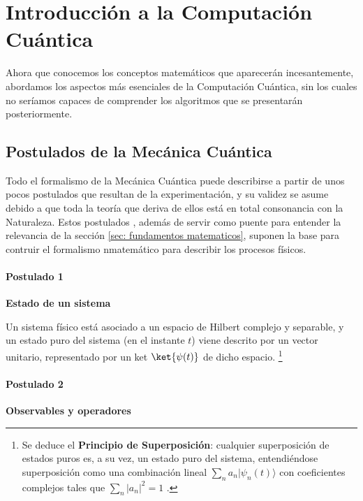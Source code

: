 \documentclass[11pt,a4paper,twoside,pdf]{article}
\numberwithin{equation}{section}
\begin{document}
		

			

	

\newpage
	
\section{Introducción a la Computación Cuántica} \label{sec: intro CC}
	  
Ahora que conocemos los conceptos matemáticos que aparecerán incesantemente, abordamos los aspectos más esenciales de la Computación Cuántica, sin los cuales no seríamos capaces de comprender los algoritmos que se presentarán posteriormente.

	\subsection{Postulados de la Mecánica Cuántica }
	
	Todo el formalismo de la Mecánica Cuántica puede describirse a partir de unos pocos postulados que resultan de la experimentación, y su validez se asume debido a que toda la teoría que deriva de ellos está en total consonancia con la Naturaleza. Estos postulados \cite{Zettili}, además de servir como puente para entender la relevancia de la sección \ref{sec: fundamentos matematicos}, suponen la base para contruir el formalismo nmatemático para describir los procesos físicos.
	
		\paragraph{Postulado 1}\label{Par: Postulado 1} \textbf{Estado de un sistema}
			
			Un sistema físico está asociado a un espacio de Hilbert complejo y separable, y un estado puro del sistema (en el instante $t$) viene descrito por un vector unitario, representado por un ket $\ket{\psi(t)} $ de dicho espacio. \footnote{ Se deduce el \textbf{Principio de Superposición}: cualquier superposición de estados puros es, a su vez, un estado puro del sistema, entendiéndose superposición como una combinación lineal $\sum_n  a_n |\psi_n(t)  \rangle $ con coeficientes complejos tales que $\sum_n |a_n|^2=1 $ .}
			  
		\paragraph{Postulado 2}\label{Par: Postulado 2} \textbf{Observables y operadores}
			
\end{document}
